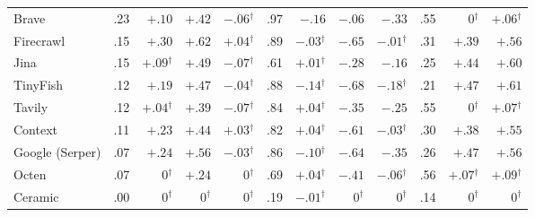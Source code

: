 \begin{tabular}{@{}lrrrrrrrrrrr@{}}
Brave & .23 & $+.10$ & $+.42$ & \textcolor{ink2}{$-.06$}$^{\dagger}$ & .97 & $-.16$ & $-.06$ & $-.33$ & .55 & \textcolor{ink2}{0}$^{\dagger}$ & \textcolor{ink2}{$+.06$}$^{\dagger}$ \\
Firecrawl & .15 & $+.30$ & $+.62$ & \textcolor{ink2}{$+.04$}$^{\dagger}$ & .89 & \textcolor{ink2}{$-.03$}$^{\dagger}$ & $-.65$ & \textcolor{ink2}{$-.01$}$^{\dagger}$ & .31 & $+.39$ & $+.56$ \\
Jina & .15 & \textcolor{ink2}{$+.09$}$^{\dagger}$ & $+.49$ & \textcolor{ink2}{$-.07$}$^{\dagger}$ & .61 & \textcolor{ink2}{$+.01$}$^{\dagger}$ & $-.28$ & $-.16$ & .25 & $+.44$ & $+.60$ \\
TinyFish & .12 & $+.19$ & $+.47$ & \textcolor{ink2}{$-.04$}$^{\dagger}$ & .88 & \textcolor{ink2}{$-.14$}$^{\dagger}$ & $-.68$ & \textcolor{ink2}{$-.18$}$^{\dagger}$ & .21 & $+.47$ & $+.61$ \\
Tavily & .12 & \textcolor{ink2}{$+.04$}$^{\dagger}$ & $+.39$ & \textcolor{ink2}{$-.07$}$^{\dagger}$ & .84 & \textcolor{ink2}{$+.04$}$^{\dagger}$ & $-.35$ & $-.25$ & .55 & \textcolor{ink2}{0}$^{\dagger}$ & \textcolor{ink2}{$+.07$}$^{\dagger}$ \\
Context & .11 & $+.23$ & $+.44$ & \textcolor{ink2}{$+.03$}$^{\dagger}$ & .82 & \textcolor{ink2}{$+.04$}$^{\dagger}$ & $-.61$ & \textcolor{ink2}{$-.03$}$^{\dagger}$ & .30 & $+.38$ & $+.55$ \\
Google (Serper) & .07 & $+.24$ & $+.56$ & \textcolor{ink2}{$-.03$}$^{\dagger}$ & .86 & \textcolor{ink2}{$-.10$}$^{\dagger}$ & $-.64$ & $-.35$ & .26 & $+.47$ & $+.56$ \\
Octen & .07 & \textcolor{ink2}{0}$^{\dagger}$ & $+.24$ & \textcolor{ink2}{0}$^{\dagger}$ & .69 & \textcolor{ink2}{$+.04$}$^{\dagger}$ & $-.41$ & \textcolor{ink2}{$-.06$}$^{\dagger}$ & .56 & \textcolor{ink2}{$+.07$}$^{\dagger}$ & \textcolor{ink2}{$+.09$}$^{\dagger}$ \\
Ceramic & .00 & \textcolor{ink2}{0}$^{\dagger}$ & \textcolor{ink2}{0}$^{\dagger}$ & \textcolor{ink2}{0}$^{\dagger}$ & .19 & \textcolor{ink2}{$-.01$}$^{\dagger}$ & \textcolor{ink2}{0}$^{\dagger}$ & \textcolor{ink2}{0}$^{\dagger}$ & .14 & \textcolor{ink2}{0}$^{\dagger}$ & \textcolor{ink2}{0}$^{\dagger}$ \\
\bottomrule
\end{tabular}
